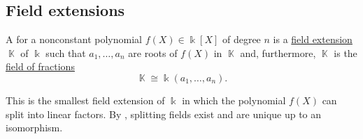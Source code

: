 \subsection{Field extensions}\label{subsec:field_extensions}

\begin{definition}\label{def:splitting_field}
  A  for a nonconstant polynomial \( f(X) \in \Bbbk[X] \) of degree \( n \) is a \hyperref[def:field_extension]{field extension} \( \BbbK \) of \( \Bbbk \) such that \( a_1, \ldots, a_n \) are roots of \( f(X) \) in \( \BbbK \) and, furthermore, \( \BbbK \) is the \hyperref[thm:field_of_fractions]{field of fractions}
  \begin{equation*}
    \BbbK \cong \Bbbk(a_1, \ldots, a_n).
  \end{equation*}

  This is the smallest field extension of \( \Bbbk \) in which the polynomial \( f(X) \) can split into linear factors. By , splitting fields exist and are unique up to an isomorphism.
\end{definition}

